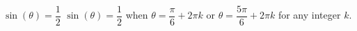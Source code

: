 {$\sin(\theta) = \dfrac{1}{2}$}
{$\sin(\theta) = \dfrac{1}{2}$ when $\theta = \dfrac{\pi}{6} + 2\pi k$ or $\theta = \dfrac{5\pi}{6} + 2\pi k$ for any integer $k$.}
